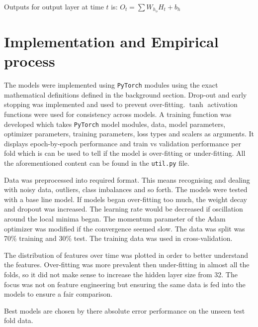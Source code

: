 \documentclass[conference]{IEEEtran}
\begin{document}
Outputs for output layer at time $t$ is: $O_{t} = \sum W_{h_o} H_{t} + b_{h}$






\section{Implementation and Empirical process}


The models were implemented using \texttt{PyTorch} modules using the exact mathematical definitions defined in the background section. Drop-out and early stopping was implemented and used to prevent over-fitting. $\tanh$ activation functions were used for consistency across models. A training function was developed which takes \texttt{PyTorch} model modules, data, model parameters, optimizer parameters, training parameters, loss types and scalers as arguments. It displays epoch-by-epoch performance and train vs validation performance per fold which is can be used to tell if the model is over-fitting or under-fitting. All the aforementioned content can be found in the \texttt{util.py} file.





Data was preprocessed into required format. This means recognising and dealing with noisy data, outliers, class imbalances and so forth. The models were tested with a base line model. If models began over-fitting too much, the weight decay and dropout was increased. The learning rate would be decreased if oscillation around the local minima began. The momentum parameter of the Adam optimizer was modified if the convergence seemed slow. The data was split was 70\% training and 30\% test. The training data was used in cross-validation.

The distribution of features over time was plotted in order to better understand the features. Over-fitting was more prevalent then under-fitting in almost all the folds, so it did not make sense to increase the hidden layer size from 32. The focus was not on feature engineering but ensuring the same data is fed into the models to ensure a fair comparison.

Best models are chosen by there absolute error performance on the unseen test fold data.
\end{document}
